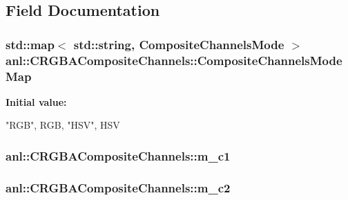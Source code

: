 \subsection{Field Documentation}
\hypertarget{classanl_1_1CRGBACompositeChannels_a5ab99299c326366e592ce98ad9ebd392}{
\subsubsection[{CompositeChannelsModeMap}]{\setlength{\rightskip}{0pt plus 5cm}std::map$<$ std::string, {\bf CompositeChannelsMode} $>$ {\bf anl::CRGBACompositeChannels::CompositeChannelsModeMap}}}
\label{classanl_1_1CRGBACompositeChannels_a5ab99299c326366e592ce98ad9ebd392}
{\bfseries Initial value:}
\begin{DoxyCode}
 {
        {"RGB", RGB},
        {"HSV", HSV}
    }
\end{DoxyCode}
\hypertarget{classanl_1_1CRGBACompositeChannels_a2e538a22c3b1c6eb261528649e27aa9f}{
\subsubsection[{m\_\-c1}]{ {\bf anl::CRGBACompositeChannels::m\_\-c1}}}
\label{classanl_1_1CRGBACompositeChannels_a2e538a22c3b1c6eb261528649e27aa9f}
\hypertarget{classanl_1_1CRGBACompositeChannels_a1b951696321ff787040ebb87fd5272c4}{
\subsubsection[{m\_\-c2}]{ {\bf anl::CRGBACompositeChannels::m\_\-c2}}}
\label{classanl_1_1CRGBACompositeChannels_a1b951696321ff787040ebb87fd5272c4}
